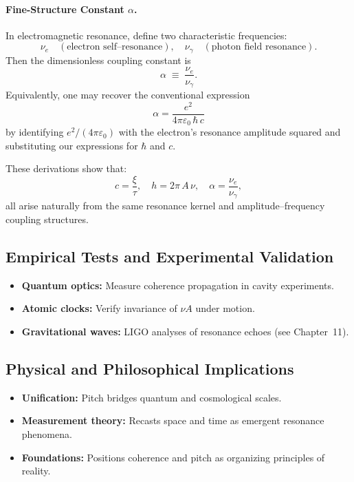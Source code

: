 \paragraph{Fine-Structure Constant \(\alpha\).}
In electromagnetic resonance, define two characteristic frequencies:
\[
  \nu_e \quad(\text{electron self–resonance}), 
  \quad
  \nu_\gamma \quad(\text{photon field resonance}).
\]
Then the dimensionless coupling constant is
\begin{equation}
  \alpha \;\equiv\;\frac{\nu_e}{\nu_\gamma}.
\end{equation}
Equivalently, one may recover the conventional expression
\[
  \alpha = \frac{e^2}{4\pi\varepsilon_0\,\hbar\,c}
\]
by identifying \(e^2/(4\pi\varepsilon_0)\) with the electron’s resonance amplitude squared and substituting our expressions for \(\hbar\) and \(c\).

\bigskip
These derivations show that:
\[
  c = \frac{\xi}{\tau}, 
  \quad
  h = 2\pi\,A\,\nu, 
  \quad
  \alpha = \frac{\nu_e}{\nu_\gamma},
\]
all arise naturally from the same resonance kernel and amplitude–frequency coupling structures.

\subsection{Empirical Tests and Experimental Validation}
\label{sec:empirical-tests}

\begin{itemize}
  \item \textbf{Quantum optics:} Measure coherence propagation in cavity experiments.
  \item \textbf{Atomic clocks:} Verify invariance of $\nu A$ under motion.
  \item \textbf{Gravitational waves:} LIGO analyses of resonance echoes (see Chapter~11).
\end{itemize}

\subsection{Physical and Philosophical Implications}
\label{sec:implications-pitch}

\begin{itemize}
  \item \textbf{Unification:} Pitch bridges quantum and cosmological scales.
  \item \textbf{Measurement theory:} Recasts space and time as emergent resonance phenomena.
  \item \textbf{Foundations:} Positions coherence and pitch as organizing principles of reality.
\end{itemize}

